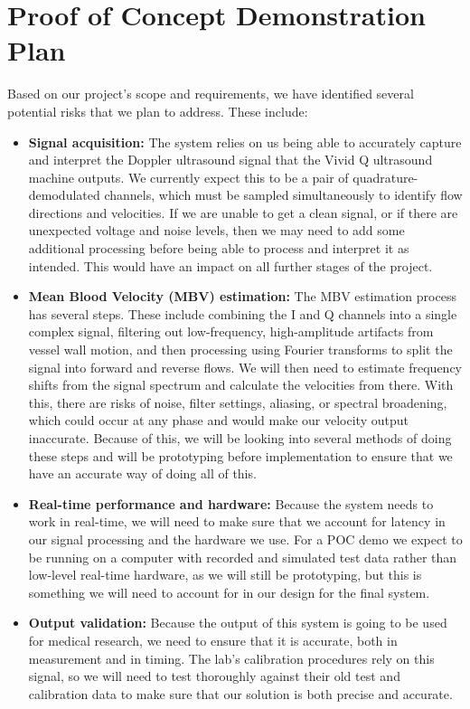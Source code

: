 \documentclass{article}
\begin{document}
\section{Proof of Concept Demonstration Plan}

Based on our project's scope and requirements, we have identified several
potential risks that we plan to address. These include:

\begin{itemize}
\item \textbf{Signal acquisition:} The system relies on us being able to
  accurately capture and interpret the Doppler ultrasound signal that the Vivid Q
  ultrasound machine outputs. We currently expect this to be a pair of
  quadrature-demodulated channels, which must be sampled simultaneously to
  identify flow directions and velocities. If we are unable to get a clean
  signal, or if there are unexpected voltage and noise levels, then we may need
  to add some additional processing before being able to process and interpret
  it as intended. This would have an impact on all further stages of the
  project.
\item \textbf{Mean Blood Velocity (MBV) estimation:} The MBV estimation process
  has several steps. These include combining the I and Q channels into a single
  complex signal, filtering out low-frequency, high-amplitude artifacts from
  vessel wall motion, and then processing using Fourier transforms to split the
  signal into forward and reverse flows. We will then need to estimate frequency
  shifts from the signal spectrum and calculate the velocities from there. With
  this, there are risks of noise, filter settings, aliasing, or spectral
  broadening, which could occur at any phase and would make our velocity output
  inaccurate. Because of this, we will be looking into several methods of doing
  these steps and will be prototyping before implementation to ensure that we
  have an accurate way of doing all of this.
\item \textbf{Real-time performance and hardware:} Because the system needs to
  work in real-time, we will need to make sure that we account for latency in
  our signal processing and the hardware we use. For a POC demo we expect to be
  running on a computer with recorded and simulated test data rather than
  low-level real-time hardware, as we will still be prototyping, but this is
  something we will need to account for in our design for the final system.
\item \textbf{Output validation:} Because the output of this system is going to
  be used for medical research, we need to ensure that it is accurate, both in
  measurement and in timing. The lab's calibration procedures rely on this
  signal, so we will need to test thoroughly against their old test and
  calibration data to make sure that our solution is both precise and accurate.
\end{itemize}
\end{document}
